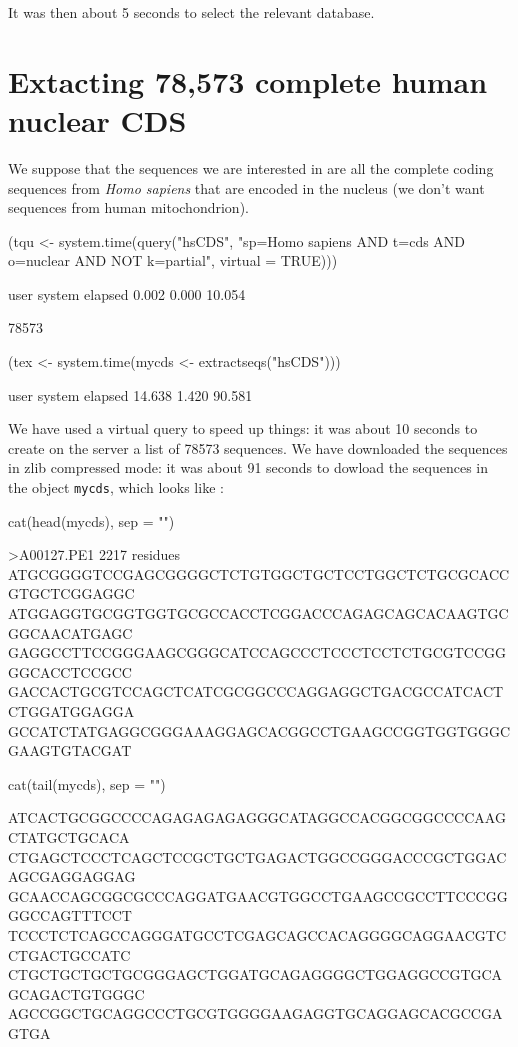 \documentclass{article}
\begin{document}
It was then about 5 
seconds to select the relevant database.

\section{Extacting 78,573 complete human nuclear CDS}

We suppose that the sequences we are interested in 
are all the complete coding sequences from \textit{Homo sapiens} that
are encoded in the nucleus (we don't want sequences from human mitochondrion). 

\begin{Schunk}
\begin{Sinput}
 (tqu <- system.time(query("hsCDS", "sp=Homo sapiens AND t=cds AND o=nuclear AND NOT k=partial", 
     virtual = TRUE)))
\end{Sinput}
\begin{Soutput}
   user  system elapsed 
  0.002   0.000  10.054 
\end{Soutput}
\begin{Soutput}
[1] 78573
\end{Soutput}
\begin{Sinput}
 (tex <- system.time(mycds <- extractseqs("hsCDS")))
\end{Sinput}
\begin{Soutput}
   user  system elapsed 
 14.638   1.420  90.581 
\end{Soutput}
\end{Schunk}
 
We have used a virtual query to speed up things:
it was about 10 seconds 
to create on the server a list of 78573
sequences. We have downloaded the sequences in zlib compressed mode:
it was about 91 seconds
to dowload the sequences in the object \texttt{mycds}, which looks like :

\begin{Schunk}
\begin{Sinput}
 cat(head(mycds), sep = "\n")
\end{Sinput}
\begin{Soutput}
>A00127.PE1             2217 residues
ATGCGGGGTCCGAGCGGGGCTCTGTGGCTGCTCCTGGCTCTGCGCACCGTGCTCGGAGGC
ATGGAGGTGCGGTGGTGCGCCACCTCGGACCCAGAGCAGCACAAGTGCGGCAACATGAGC
GAGGCCTTCCGGGAAGCGGGCATCCAGCCCTCCCTCCTCTGCGTCCGGGGCACCTCCGCC
GACCACTGCGTCCAGCTCATCGCGGCCCAGGAGGCTGACGCCATCACTCTGGATGGAGGA
GCCATCTATGAGGCGGGAAAGGAGCACGGCCTGAAGCCGGTGGTGGGCGAAGTGTACGAT
\end{Soutput}
\begin{Sinput}
 cat(tail(mycds), sep = "\n")
\end{Sinput}
\begin{Soutput}
ATCACTGCGGCCCCAGAGAGAGAGGGCATAGGCCACGGCGGCCCCAAGCTATGCTGCACA
CTGAGCTCCCTCAGCTCCGCTGCTGAGACTGGCCGGGACCCGCTGGACAGCGAGGAGGAG
GCAACCAGCGGCGCCCAGGATGAACGTGGCCTGAAGCCGCCTTCCCGGGGCCAGTTTCCT
TCCCTCTCAGCCAGGGATGCCTCGAGCAGCCACAGGGGCAGGAACGTCCTGACTGCCATC
CTGCTGCTGCTGCGGGAGCTGGATGCAGAGGGGCTGGAGGCCGTGCAGCAGACTGTGGGC
AGCCGGCTGCAGGCCCTGCGTGGGGAAGAGGTGCAGGAGCACGCCGAGTGA
\end{Soutput}
\end{Schunk}
\end{document}
